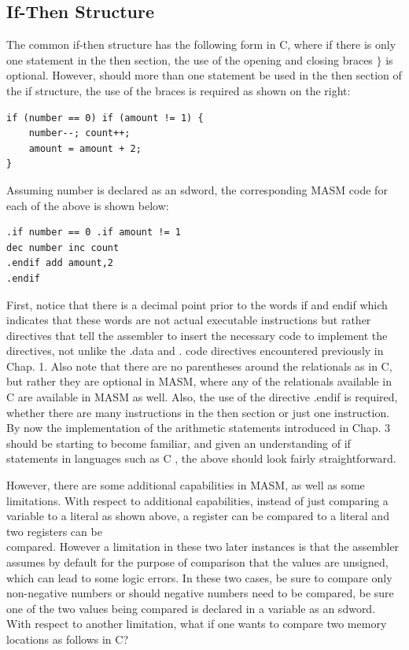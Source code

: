\documentclass[10pt]{book}
\begin{document}
\subsection{If-Then Structure}
The common if-then structure has the following form in C, where if there is only one statement in the then section, the use of the opening and closing braces $\}$ is optional. However, should more than one statement be used in the then section of the if structure, the use of the braces is required as shown on the right:

\begin{verbatim}
if (number == 0) if (amount != 1) {
    number--; count++;
    amount = amount + 2;
}
\end{verbatim}

Assuming number is declared as an sdword, the corresponding MASM code for each of the above is shown below:

\begin{verbatim}
.if number == 0 .if amount != 1
dec number inc count
.endif add amount,2
.endif
\end{verbatim}

First, notice that there is a decimal point prior to the words if and endif which indicates that these words are not actual executable instructions but rather directives that tell the assembler to insert the necessary code to implement the directives, not unlike the .data and . code directives encountered previously in Chap. 1. Also note that there are no parentheses around the relationals as in C, but rather they are optional in MASM, where any of the relationals available in C are available in MASM as well. Also, the use of the directive .endif is required, whether there are many instructions in the then section or just one instruction. By now the implementation of the arithmetic statements introduced in Chap. 3 should be starting to become familiar, and given an understanding of if statements in languages such as C , the above should look fairly straightforward.

However, there are some additional capabilities in MASM, as well as some limitations. With respect to additional capabilities, instead of just comparing a variable to a literal as shown above, a register can be compared to a literal and two registers can be\\
compared. However a limitation in these two later instances is that the assembler assumes by default for the purpose of comparison that the values are unsigned, which can lead to some logic errors. In these two cases, be sure to compare only non-negative numbers or should negative numbers need to be compared, be sure one of the two values being compared is declared in a variable as an sdword. With respect to another limitation, what if one wants to compare two memory locations as follows in C?
\end{document}
